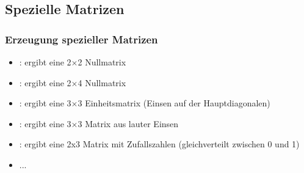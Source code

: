     \subsection{Spezielle Matrizen}
    \begin{frame}
        \frametitle{Erzeugung spezieller Matrizen}
        \begin{itemize}
            \item {}: ergibt eine 2$\times$2 Nullmatrix
            \item {}: ergibt eine 2$\times$4 Nullmatrix
            \item {}: ergibt eine 3$\times$3 Einheitsmatrix (Einsen auf der Hauptdiagonalen)
            \item {}: ergibt eine 3$\times$3 Matrix aus lauter Einsen
            \item {}: ergibt eine 2x3 Matrix mit Zufallszahlen (gleichverteilt zwischen 0 und 1)
            \item ...
        \end{itemize}
    \end{frame}



